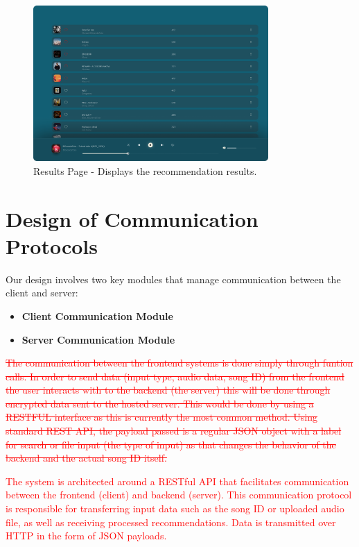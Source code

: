 \documentclass[12pt, titlepage]{article}
\begin{document}
\begin{figure}[h!]
  \centering
  \includegraphics[width=0.8\textwidth]{UI_Images/Results_Page.png}
  \caption{Results Page - Displays the recommendation results.}
  \label{fig:results_page}
\end{figure}


\section{Design of Communication Protocols}

Our design involves two key modules that manage communication between the client and server:
\begin{itemize}
  \item \textbf{Client Communication Module}
  \item \textbf{Server Communication Module}
\end{itemize}

\textcolor{red}{\sout{The communication between the frontend systems is done simply through funtion calls. In order to send data (input type, audio data, song ID) from the frontend the user 
interacts with to the backend (the server) this will be done through encrypted data sent to the hosted server. This would be done by using
a RESTFUL interface as this is currently the most common method. Using standard REST API, the payload passed is a regular JSON object with 
a label for search or file input (the type of input) as that changes the behavior of the backend and the actual song ID itself. }}

\textcolor{red}{The system is architected around a RESTful API that facilitates communication between the frontend (client) and backend (server). This communication protocol is responsible for transferring input data such as the song ID or uploaded audio file, as well as receiving processed recommendations. Data is transmitted over HTTP in the form of JSON payloads.}
\end{document}
